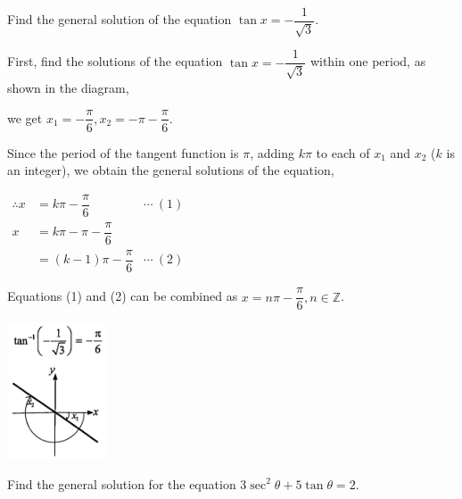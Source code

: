 \documentclass{report}
\begin{document}
\begin{question}
	Find the general solution of the equation $\tan x=-\dfrac{1}{\sqrt{3}}$.
	
	\sol{}
	\begin{vwcol}[widths={0.6,0.4}, sep=0.8cm, justify=flush,rule=0pt]
		\noindent First, find the solutions of the equation $\tan x=-\dfrac{1}{\sqrt{3}}$ within one period, as shown in the diagram,
		
		\noindent we get $x_1=-\dfrac{\pi}{6}, x_2=-\pi-\dfrac{\pi}{6}$.
		
		\noindent Since the period of the tangent function is $\pi$, adding $k\pi$ to each of $x_1$ and $x_2$ ($k$ is an integer), we obtain the general solutions of the equation,
		
		\vspace{1em}
		\noindent $
		\begin{aligned}
			\therefore x & =k\pi-\dfrac{\pi}{6}     & \cdots\ (1) \\
			x & =k\pi-\pi-\dfrac{\pi}{6} \\
			             & =(k-1)\pi-\dfrac{\pi}{6} & \cdots\ (2) 
		\end{aligned}
		$
		
		\noindent Equations (1) and (2) can be combined as $x=n\pi-\dfrac{\pi}{6}, n \in \mathbb{Z}$.
		\vspace{4em}
		
		\includegraphics[width=0.22\textwidth]{assets/11-16.jpg}
	\end{vwcol}
	\vspace{-1em}
\end{question}


Find the general solution for the equation $3\sec^2\theta + 5\tan\theta = 2$.

\end{document}
